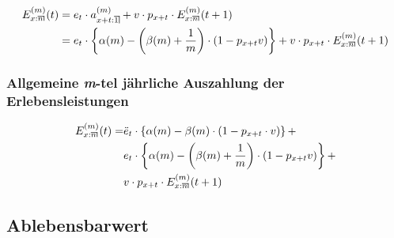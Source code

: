 \documentclass[a4paper,10pt]{article}
\makeatletter
\newcommand{\xn}{{\act[x]{n}}}
\DeclareRobustCommand{\act}[2][]{%
\def\arraystretch{0}%
\setlength\arraycolsep{0.5pt}%
\setlength\arrayrulewidth{0.5pt}%
\setbox0=\hbox{$\scriptstyle#1\ifx#1\empty{asdf}\else:\fi#2$}%
\begin{array}[b]{*2{@{}>{\scriptstyle}c}|}
\cline{2-2}%
\rule[1.25pt]{0pt}{\ht0}%
#1\ifx#1\empty\else:\fi & #2%
\end{array}%
}
\makeatother
\begin{document}
\begin{align*}
E^{(m)}_\xn(t) &= e_t \cdot a_{\act[x+t]{1}}^{(m)} + v \cdot p_{x+t} \cdot E^{(m)}_\xn(t+1)\\
   &= e_t\cdot\left\{\alpha(m) - \left(\beta(m)+\frac1m\right)\cdot\left(1-p_{x+t} v\right)\right\} + v\cdot p_{x+t} \cdot E^{(m)}_\xn(t+1)
\end{align*}

\subsubsection{Allgemeine \textit{m}-tel jährliche Auszahlung der Erlebensleistungen}


\begin{align*}
E^{(m)}_\xn(t) = &\ddot{e}_t \cdot \left\{\alpha(m)  - \beta(m) \cdot \left(1-p_{x+t} \cdot v\right)\right\} +  \\
 &e_t\cdot\left\{\alpha(m) - \left(\beta(m)+\frac1m\right)\cdot\left(1-p_{x+t} v\right)\right\} + \\
 &v\cdot p_{x+t} \cdot E^{(m)}_\xn(t+1)
\end{align*}




\subsection{Ablebensbarwert}
\end{document}
